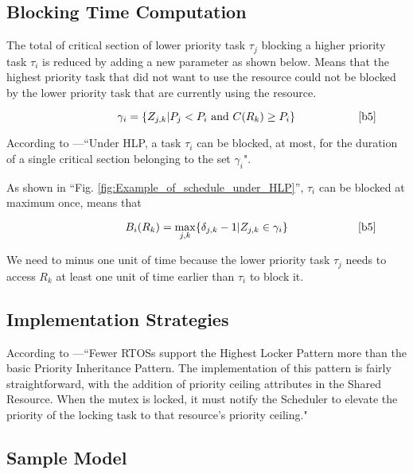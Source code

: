  
\subsection{Blocking Time Computation}

The total of critical section of lower priority task $\tau_{j}$ blocking a higher priority task $\tau_{i}$ is reduced by adding a new parameter as shown below. Means that the highest priority task that did not want to use the resource could not be blocked by the lower priority task that are currently using the resource.

\begin{equation}
\citeequation{\gamma_{i}=\{Z_{j,k} | P_{j}<P_{i} \text{   and } C(R_{k})\geq P_{i} \}}{b5}\label{eq3}
\end{equation}

According to \cite{b5}---``Under HLP, a task $ \tau_{i} $ can be blocked, at most, for the duration of a single critical section belonging to the set $ \gamma_{i} $".  

As shown in ``Fig. \ref{fig:Example_of_schedule_under_HLP}'', $ \tau_{i} $ can be blocked at maximum once, means that

\begin{equation}
\citeequation{B_{i}(R_{k})=\underset{j,k}{\mathrm{max}} \{ \delta_{j,k}-1 | Z_{j,k} \in \gamma_{i}\}}{b5}\label{eq4}  
\end{equation}

We need to minus one unit of time because the lower priority task $ \tau_{j} $ needs to access $ R_{k} $ at least one unit of time earlier than $ \tau_{i} $ to block it.

\subsection{Implementation Strategies} 

According to \cite{b6}---``Fewer RTOSs support the Highest Locker Pattern more than the basic Priority Inheritance Pattern. The implementation of this pattern  is fairly straightforward, with the addition of priority ceiling attributes in the Shared Resource. When the mutex is locked, it must notify the Scheduler to elevate the priority of the locking task to that resource's priority ceiling."

\subsection{Sample Model} 

